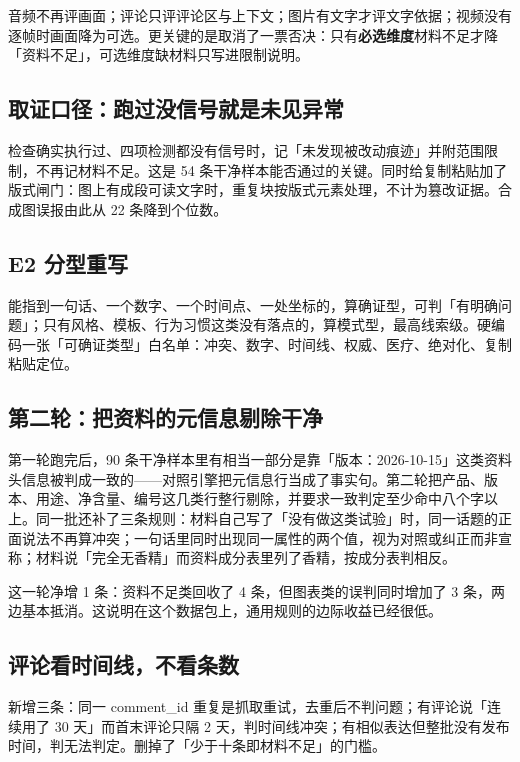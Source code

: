 \documentclass[11pt]{ctexart}
\begin{document}
音频不再评画面；评论只评评论区与上下文；图片有文字才评文字依据；视频没有逐帧时画面降为可选。更关键的是取消了一票否决：只有\textbf{必选维度}材料不足才降「资料不足」，可选维度缺材料只写进限制说明。

\subsection{取证口径：跑过没信号就是未见异常}

检查确实执行过、四项检测都没有信号时，记「未发现被改动痕迹」并附范围限制，不再记材料不足。这是 54 条干净样本能否通过的关键。同时给复制粘贴加了版式闸门：图上有成段可读文字时，重复块按版式元素处理，不计为篡改证据。合成图误报由此从 22 条降到个位数。

\subsection{E2 分型重写}

能指到一句话、一个数字、一个时间点、一处坐标的，算确证型，可判「有明确问题」；只有风格、模板、行为习惯这类没有落点的，算模式型，最高线索级。硬编码一张「可确证类型」白名单：冲突、数字、时间线、权威、医疗、绝对化、复制粘贴定位。

\subsection{第二轮：把资料的元信息剔除干净}

第一轮跑完后，90 条干净样本里有相当一部分是靠「版本：2026-10-15」这类资料头信息被判成一致的——对照引擎把元信息行当成了事实句。第二轮把产品、版本、用途、净含量、编号这几类行整行剔除，并要求一致判定至少命中八个字以上。同一批还补了三条规则：材料自己写了「没有做这类试验」时，同一话题的正面说法不再算冲突；一句话里同时出现同一属性的两个值，视为对照或纠正而非宣称；材料说「完全无香精」而资料成分表里列了香精，按成分表判相反。

这一轮净增 1 条：资料不足类回收了 4 条，但图表类的误判同时增加了 3 条，两边基本抵消。这说明在这个数据包上，通用规则的边际收益已经很低。

\subsection{评论看时间线，不看条数}

新增三条：同一 comment\_id 重复是抓取重试，去重后不判问题；有评论说「连续用了 30 天」而首末评论只隔 2 天，判时间线冲突；有相似表达但整批没有发布时间，判无法判定。删掉了「少于十条即材料不足」的门槛。
\end{document}
